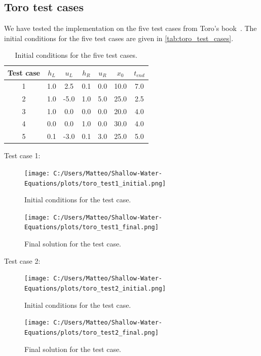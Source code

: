 \subsection{Toro test cases}
We have tested the implementation on the five test cases from Toro's book~\cite{Toro2001-Shock}.
The initial conditions for the five test cases are given in \autoref{tab:toro_test_cases}.

\begin{table}[H]
    \centering
    \begin{tabular}{c|c|c|c|c|c|c}
        \hline
        \textbf{Test case} & \textbf{$h_L$} & \textbf{$u_L$} & \textbf{$h_R$} & \textbf{$u_R$} & \textbf{$x_0$} & \textbf{$t_{end}$} \\
        \hline\hline
        1 & 1.0 & 2.5 & 0.1 & 0.0 & 10.0 & 7.0 \\
        2 & 1.0 & -5.0 & 1.0 & 5.0 & 25.0 & 2.5 \\
        3 & 1.0 & 0.0 & 0.0 & 0.0 & 20.0 & 4.0 \\
        4 & 0.0 & 0.0 & 1.0 & 0.0 & 30.0 & 4.0 \\
        5 & 0.1 & -3.0 & 0.1 & 3.0 & 25.0 & 5.0 \\
        \hline
    \end{tabular}
    \caption{Initial conditions for the five test cases.}
    \label{tab:toro_test_cases}
\end{table}



Test case 1:
\begin{figure}[H]
    \centering
    \texttt{[image: C:/Users/Matteo/Shallow-Water-Equations/plots/toro\_test1\_initial.png]}
    \caption{Initial conditions for the test case.}\label{fig:toro_test1_initial}
\end{figure}


\begin{figure}[H]
    \centering
    \texttt{[image: C:/Users/Matteo/Shallow-Water-Equations/plots/toro\_test1\_final.png]}
    \caption{Final solution for the test case.}\label{fig:toro_test1_final}
\end{figure}


Test case 2: 
\begin{figure}[H]
    \centering
    \texttt{[image: C:/Users/Matteo/Shallow-Water-Equations/plots/toro\_test2\_initial.png]}
    \caption{Initial conditions for the test case.}\label{fig:toro_test2_initial}
\end{figure}

\begin{figure}[H]
    \centering
    \texttt{[image: C:/Users/Matteo/Shallow-Water-Equations/plots/toro\_test2\_final.png]}
    \caption{Final solution for the test case.}\label{fig:toro_test2_final}
\end{figure}


